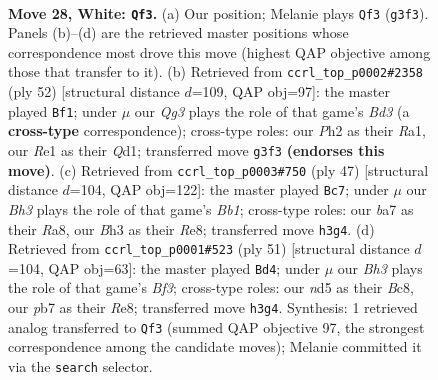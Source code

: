 \documentclass[11pt]{article}
\begin{document}
\clearpage

\begin{figure}[p]\centering
\begin{subfigure}{0.46\textwidth}\centering
\resizebox{\linewidth}{!}{%
\newchessgame
\chessboard[
  setfen={r3r2k/bp1b1pp1/pq2p3/3n3P/8/BP1p2QB/P2P1PKP/RN2R3 w - - 0 28},
  showmover=false,
  pgfstyle=straightmove, color=movearrow, markmove={g3-f3}
]}
\caption{}
\end{subfigure}\hfill
\begin{subfigure}{0.46\textwidth}\centering
\resizebox{\linewidth}{!}{%
\newchessgame
\chessboard[
  setfen={r1r4k/1b1nb1pp/1q2p3/p2pPp2/3P1P2/3BB3/RP3NPP/R2Q2K1 w - - 1 27},
  showmover=false,
  pgfstyle=straightmove, color=movearrow, markmove={d3-f1}
]}
\caption{}
\end{subfigure}
\\[4pt]
\begin{subfigure}{0.46\textwidth}\centering
\resizebox{\linewidth}{!}{%
\newchessgame
\chessboard[
  setfen={rb2r1k1/5ppp/2p3b1/1p2P3/q2P4/2P1BQ2/P2N2PP/R4RK1 b - - 4 24},
  showmover=false,
  pgfstyle=straightmove, color=movearrow, markmove={b8-c7}
]}
\caption{}
\end{subfigure}\hfill
\begin{subfigure}{0.46\textwidth}\centering
\resizebox{\linewidth}{!}{%
\newchessgame
\chessboard[
  setfen={1rb1r1k1/4qp1p/p2p1bpB/2pP3n/8/R3N1PP/1P2PPB1/1RQ3K1 b - - 7 26},
  showmover=false,
  pgfstyle=straightmove, color=movearrow, markmove={f6-d4}
]}
\caption{}
\end{subfigure}
\caption{\textbf{Move 28, White: \texttt{Qf3}.} (a) Our position; Melanie plays \texttt{Qf3} (\texttt{g3f3}). Panels (b)--(d) are the retrieved master positions whose correspondence most drove this move (highest QAP objective among those that transfer to it). (b) Retrieved from \texttt{ccrl\_top\_p0002\#2358} (ply 52) [structural distance $d$=109, QAP obj=97]: the master played \texttt{Bf1}; under $\mu$ our \emph{Qg3} plays the role of that game's \emph{Bd3} (a \textbf{cross-type} correspondence); cross-type roles: our \emph{P}h2 as their \emph{R}a1, our \emph{R}e1 as their \emph{Q}d1; transferred move \texttt{g3f3} \textbf{(endorses this move)}. (c) Retrieved from \texttt{ccrl\_top\_p0003\#750} (ply 47) [structural distance $d$=104, QAP obj=122]: the master played \texttt{Bc7}; under $\mu$ our \emph{Bh3} plays the role of that game's \emph{Bb1}; cross-type roles: our \emph{b}a7 as their \emph{R}a8, our \emph{B}h3 as their \emph{R}e8; transferred move \texttt{h3g4}. (d) Retrieved from \texttt{ccrl\_top\_p0001\#523} (ply 51) [structural distance $d$=104, QAP obj=63]: the master played \texttt{Bd4}; under $\mu$ our \emph{Bh3} plays the role of that game's \emph{Bf3}; cross-type roles: our \emph{n}d5 as their \emph{B}c8, our \emph{p}b7 as their \emph{R}e8; transferred move \texttt{h3g4}. Synthesis: 1 retrieved analog transferred to \texttt{Qf3} (summed QAP objective 97, the strongest correspondence among the candidate moves); Melanie committed it via the \texttt{search} selector.}
\label{fig:thought-m54}
\end{figure}
\end{document}
